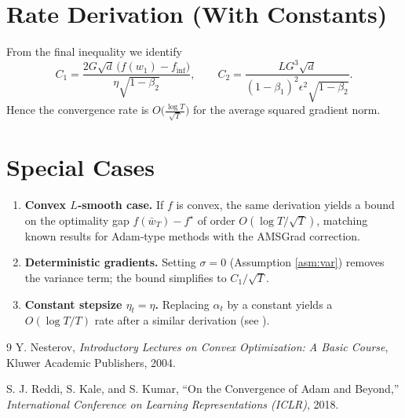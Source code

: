 \documentclass{article}
\begin{document}
\section*{Rate Derivation (With Constants)}
From the final inequality we identify
\[
C_1 = \frac{2G\sqrt{d}\,\big(f(w_1)-f_{\inf}\big)}{\eta\sqrt{1-\beta_2}},\qquad
C_2 = \frac{L G^{3}\sqrt{d}}{(1-\beta_1)^{2}\epsilon^{2}\sqrt{1-\beta_2}}.
\]
Hence the convergence rate is $O\!\big(\frac{\log T}{\sqrt{T}}\big)$ for the average squared gradient norm.

\section*{Special Cases}
\begin{enumerate}
\item \textbf{Convex $L$‑smooth case.} If $f$ is convex, the same derivation yields a bound on the optimality gap $f(\bar w_T)-f^\star$ of order $O(\log T/\sqrt{T})$, matching known results for Adam‑type methods with the AMSGrad correction.
\item \textbf{Deterministic gradients.} Setting $\sigma=0$ (Assumption \ref{asm:var}) removes the variance term; the bound simplifies to $C_1/\sqrt{T}$.
\item \textbf{Constant stepsize $\eta_t=\eta$.} Replacing $\alpha_t$ by a constant yields a $O(\log T/T)$ rate after a similar derivation (see \cite{Reddi2018AMSGrad}).
\end{enumerate}

\begin{thebibliography}{9}
Y. Nesterov, \emph{Introductory Lectures on Convex Optimization: A Basic Course}, Kluwer Academic Publishers, 2004.

S. J. Reddi, S. Kale, and S. Kumar, ``On the Convergence of Adam and Beyond,'' \emph{International Conference on Learning Representations (ICLR)}, 2018.
\end{thebibliography}
\end{document}
